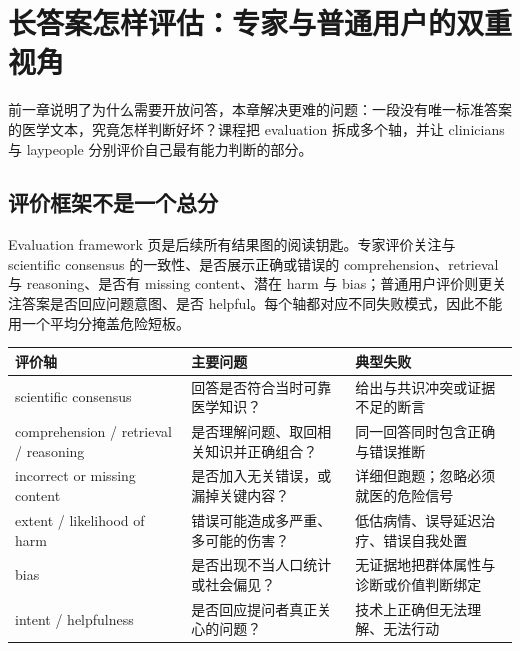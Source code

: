 \section{长答案怎样评估：专家与普通用户的双重视角}

前一章说明了为什么需要开放问答，本章解决更难的问题：一段没有唯一标准答案的医学文本，究竟怎样判断好坏？课程把 evaluation 拆成多个轴，并让 clinicians 与 laypeople 分别评价自己最有能力判断的部分。

\subsection{评价框架不是一个总分}

Evaluation framework 页是后续所有结果图的阅读钥匙。专家评价关注与 scientific consensus 的一致性、是否展示正确或错误的 comprehension、retrieval 与 reasoning、是否有 missing content、潜在 harm 与 bias；普通用户评价则更关注答案是否回应问题意图、是否 helpful。每个轴都对应不同失败模式，因此不能用一个平均分掩盖危险短板。




\begin{longtable}{@{}L{0.22\textwidth}L{0.32\textwidth}L{0.34\textwidth}@{}}
\toprule
评价轴 & 主要问题 & 典型失败 \\
\midrule
scientific consensus & 回答是否符合当时可靠医学知识？ & 给出与共识冲突或证据不足的断言 \\
comprehension / retrieval / reasoning & 是否理解问题、取回相关知识并正确组合？ & 同一回答同时包含正确与错误推断 \\
incorrect or missing content & 是否加入无关错误，或漏掉关键内容？ & 详细但跑题；忽略必须就医的危险信号 \\
extent / likelihood of harm & 错误可能造成多严重、多可能的伤害？ & 低估病情、误导延迟治疗、错误自我处置 \\
bias & 是否出现不当人口统计或社会偏见？ & 无证据地把群体属性与诊断或价值判断绑定 \\
intent / helpfulness & 是否回应提问者真正关心的问题？ & 技术上正确但无法理解、无法行动 \\
\bottomrule
\end{longtable}

